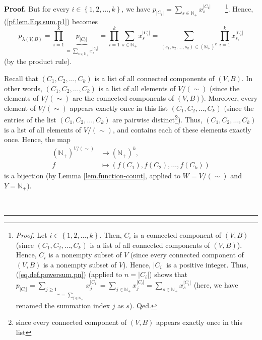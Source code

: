 \documentclass[numbers=enddot,12pt,final,onecolumn,notitlepage]{scrartcl}%
\theoremstyle{definition}
\newenvironment{proof}[1][Proof]{\noindent\textbf{#1.} }{\ \rule{0.5em}{0.5em}}
\newenvironment{verlong}{}{}
\let\sumnonlimits\sum
\let\prodnonlimits\prod
\renewcommand{\sum}{\sumnonlimits\limits}
\renewcommand{\prod}{\prodnonlimits\limits}
\begin{document}
\begin{verlong}
\begin{proof}
But for every $i\in\left\{  1,2,\ldots,k\right\}  $, we have $p_{\left\vert
C_{i}\right\vert }=\sum_{s\in\mathbb{N}_{+}}x_{s}^{\left\vert C_{i}\right\vert
}$\ \ \ \ \footnote{\textit{Proof.} Let $i\in\left\{  1,2,\ldots,k\right\}  $.
Then, $C_{i}$ is a connected component of $\left(  V,B\right)  $ (since
$\left(  C_{1},C_{2},\ldots,C_{k}\right)  $ is a list of all connected
components of $\left(  V,B\right)  $). Hence, $C_{i}$ is a nonempty subset of
$V$ (since every connected component of $\left(  V,B\right)  $ is a nonempty
subset of $V$). Hence, $\left\vert C_{i}\right\vert $ is a positive integer.
Thus, (\ref{eq.def.powersum.pn}) (applied to $n=\left\vert C_{i}\right\vert $)
shows that $p_{\left\vert C_{i}\right\vert }=\underbrace{\sum_{j\geq1}}%
_{=\sum_{j\in\mathbb{N}_{+}}}x_{j}^{\left\vert C_{i}\right\vert }=\sum
_{j\in\mathbb{N}_{+}}x_{j}^{\left\vert C_{i}\right\vert }=\sum_{s\in
\mathbb{N}_{+}}x_{s}^{\left\vert C_{i}\right\vert }$ (here, we have renamed
the summation index $j$ as $s$). Qed.}. Hence, (\ref{pf.lem.Eqs.sum.p1})
becomes%
\begin{equation}
p_{\lambda\left(  V,B\right)  }=\prod_{i=1}^{k}\underbrace{p_{\left\vert
C_{i}\right\vert }}_{=\sum_{s\in\mathbb{N}_{+}}x_{s}^{\left\vert
C_{i}\right\vert }}=\prod_{i=1}^{k}\sum_{s\in\mathbb{N}_{+}}x_{s}^{\left\vert
C_{i}\right\vert }=\sum_{\left(  s_{1},s_{2},\ldots,s_{k}\right)  \in\left(
\mathbb{N}_{+}\right)  ^{k}}\prod_{i=1}^{k}x_{s_{i}}^{\left\vert
C_{i}\right\vert } \label{pf.lem.Eqs.sum.p2}%
\end{equation}
(by the product rule).

Recall that $\left(  C_{1},C_{2},\ldots,C_{k}\right)  $ is a list of all
connected components of $\left(  V,B\right)  $. In other words, $\left(
C_{1},C_{2},\ldots,C_{k}\right)  $ is a list of all elements of $V/\left(
\sim\right)  $ (since the elements of $V/\left(  \sim\right)  $ are the
connected components of $\left(  V,B\right)  $). Moreover, every element of
$V/\left(  \sim\right)  $ appears exactly once in this list $\left(
C_{1},C_{2},\ldots,C_{k}\right)  $ (since the entries of the list $\left(
C_{1},C_{2},\ldots,C_{k}\right)  $ are pairwise distinct\footnote{since every
connected component of $\left(  V,B\right)  $ appears exactly once in this
list}). Thus, $\left(  C_{1},C_{2},\ldots,C_{k}\right)  $ is a list of all
elements of $V/\left(  \sim\right)  $, and contains each of these elements
exactly once. Hence, the map%
\begin{align*}
\left(  \mathbb{N}_{+}\right)  ^{V/\left(  \sim\right)  }  &  \rightarrow
\left(  \mathbb{N}_{+}\right)  ^{k},\\
f  &  \mapsto\left(  f\left(  C_{1}\right)  ,f\left(  C_{2}\right)
,\ldots,f\left(  C_{k}\right)  \right)
\end{align*}
is a bijection (by Lemma \ref{lem.function-count}, applied to $W=V/\left(
\sim\right)  $ and $Y=\mathbb{N}_{+}$).


\end{proof}
\end{verlong}
\end{document}
